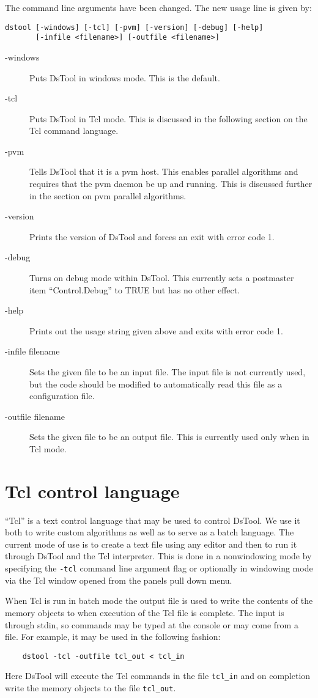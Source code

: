 The command line arguments have been changed.  The new usage line is
given by:
\begin{verbatim}
dstool [-windows] [-tcl] [-pvm] [-version] [-debug] [-help]
       [-infile <filename>] [-outfile <filename>]
\end{verbatim}
\begin{description}
\item[-windows] Puts DsTool in windows mode. This is the default.
\item[-tcl] Puts DsTool in Tcl mode. This is discussed in the 
	following section on the Tcl command language.
\item[-pvm]  Tells DsTool that it is a pvm host.  This enables parallel 
	algorithms and requires that the pvm daemon be up and running.
	This is discussed further in the section on pvm parallel algorithms.
\item[-version] Prints the version of DsTool and forces an exit
	with error code 1.
\item[-debug] Turns on debug mode within DsTool.  This currently sets
	a postmaster item ``Control.Debug'' to TRUE but has no other effect.
\item[-help] Prints out the usage string given above and exits
	with error code 1.
\item[-infile filename] Sets the given file to be an input file.
	The input file is not currently used, but the code should
	be modified to automatically read this file as a configuration
	file.
\item[-outfile filename] Sets the given file to be an output file.
	This is currently used only when in Tcl mode.
\end{description}



\section{Tcl control language}

``Tcl'' is a text control language \cite{tcl} that may be used
to control DsTool.  We use it both to write custom algorithms as
well as to serve as a batch language.  The current mode of use is to
create a text file using any editor and then to run it through 
DsTool and the Tcl interpreter.  This is done in a nonwindowing mode by
specifying the {\tt -tcl} command line argument flag or optionally 
in windowing mode via the Tcl window opened from the panels pull down menu.

When Tcl is run in batch mode the output file is used to write the contents
of the memory objects to when execution of the Tcl file is complete.
The input is through stdin, so commands may be typed at the console or
may come from a file.  For example, it may be used in the following fashion:
\begin{verbatim}
	dstool -tcl -outfile tcl_out < tcl_in
\end{verbatim}
Here DsTool will execute the Tcl commands in the file {\tt tcl\_in}
and on completion write the memory objects to the file {\tt tcl\_out}.


